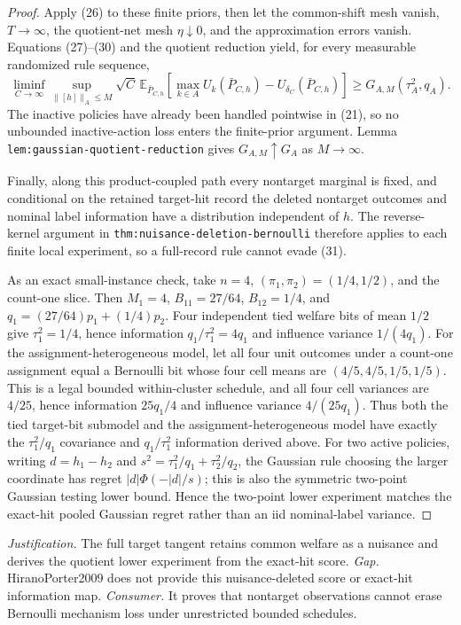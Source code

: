 \documentclass{article}
\begin{document}
\begin{proof}
Apply (26) to these finite priors, then let the common-shift mesh vanish, \(T\to\infty\), the quotient-net mesh \(\eta\downarrow0\), and the approximation errors vanish.  Equations (27)--(30) and the quotient reduction yield, for every measurable randomized rule sequence,
\[
\liminf_{C\to\infty}\sup_{\lVert[h]\rVert_A\leq M}
\sqrt C\,\mathbb E_{\bar P_{C,h}}
\left[\max_{k\in A}U_k(\bar P_{C,h})
-U_{\delta_C}(\bar P_{C,h})\right]
\geq G_{A,M}(\tau_A^2,q_A).
\tag{31}
\]
The inactive policies have already been handled pointwise in (21), so no unbounded inactive-action loss enters the finite-prior argument.  Lemma \texttt{lem:gaussian-quotient-reduction} gives \(G_{A,M}\uparrow G_A\) as \(M\to\infty\).

Finally, along this product-coupled path every nontarget marginal is fixed, and conditional on the retained target-hit record the deleted nontarget outcomes and nominal label information have a distribution independent of \(h\).  The reverse-kernel argument in \texttt{thm:nuisance-deletion-bernoulli} therefore applies to each finite local experiment, so a full-record rule cannot evade (31).

As an exact small-instance check, take \(n=4\), \((\pi_1,\pi_2)=(1/4,1/2)\), and the count-one slice.  Then \(M_1=4\), \(B_{11}=27/64\), \(B_{12}=1/4\), and \(q_1=(27/64)p_1+(1/4)p_2\).  Four independent tied welfare bits of mean \(1/2\) give \(\tau_1^2=1/4\), hence information \(q_1/\tau_1^2=4q_1\) and influence variance \(1/(4q_1)\).  For the assignment-heterogeneous model, let all four unit outcomes under a count-one assignment equal a Bernoulli bit whose four cell means are \((4/5,4/5,1/5,1/5)\).  This is a legal bounded within-cluster schedule, and all four cell variances are \(4/25\), hence information \(25q_1/4\) and influence variance \(4/(25q_1)\).  Thus both the tied target-bit submodel and the assignment-heterogeneous model have exactly the \(\tau_1^2/q_1\) covariance and \(q_1/\tau_1^2\) information derived above.  For two active policies, writing \(d=h_1-h_2\) and \(s^2=\tau_1^2/q_1+\tau_2^2/q_2\), the Gaussian rule choosing the larger coordinate has regret \(|d|\Phi(-|d|/s)\); this is also the symmetric two-point Gaussian testing lower bound.  Hence the two-point lower experiment matches the exact-hit pooled Gaussian regret rather than an iid nominal-label variance.
\end{proof}
\par\smallskip\noindent \textit{Justification.} The full target tangent retains common welfare as a nuisance and derives the quotient lower experiment from the exact-hit score. \textit{Gap.} HiranoPorter2009 does not provide this nuisance-deleted score or exact-hit information map. \textit{Consumer.} It proves that nontarget observations cannot erase Bernoulli mechanism loss under unrestricted bounded schedules.
\end{document}
